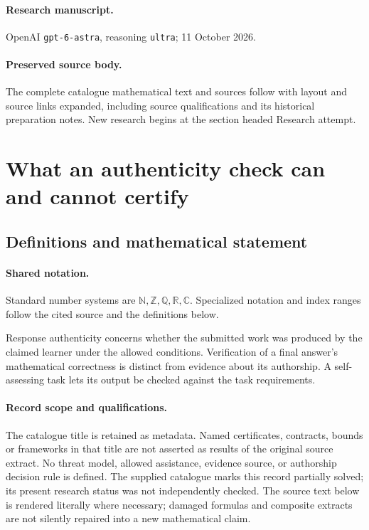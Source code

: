 \documentclass[11pt]{article}
\begin{document}
\paragraph{Research manuscript.} OpenAI \texttt{gpt-6-astra}, reasoning \texttt{ultra}; 11 October 2026.
\paragraph{Preserved source body.} The complete catalogue mathematical text and sources follow with layout and source links expanded, including source qualifications and its historical preparation notes. New research begins at the section headed Research attempt.

\section{What an authenticity check can and cannot certify}\label{statement}

\subsection{Definitions and mathematical statement}

\paragraph{Shared notation.}Standard number systems are $\mathbb N,\mathbb Z,\mathbb Q,\mathbb R,\mathbb C$. Specialized notation and index ranges follow the cited source and the definitions below.


Response authenticity concerns whether the submitted work was produced by the claimed learner under the allowed conditions. Verification of a final answer's mathematical correctness is distinct from evidence about its authorship. A self-assessing task lets its output be checked against the task requirements.
\paragraph{Record scope and qualifications.}
The catalogue title is retained as metadata. Named certificates, contracts, bounds or frameworks in that title are not asserted as results of the original source extract.
No threat model, allowed assistance, evidence source, or authorship decision rule is defined. The supplied catalogue marks this record partially solved; its present research status was not independently checked.
The source text below is rendered literally where necessary; damaged formulas and composite extracts are not silently repaired into a new mathematical claim.
\end{document}
